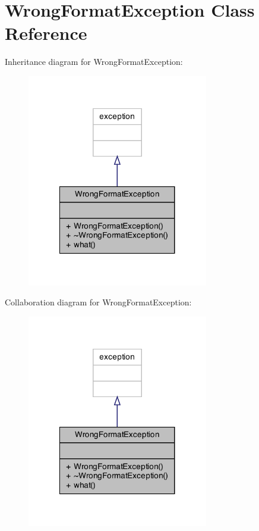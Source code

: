 \hypertarget{class_wrong_format_exception}{\section{Wrong\+Format\+Exception Class Reference}
\label{class_wrong_format_exception}
}


Inheritance diagram for Wrong\+Format\+Exception\+:\nopagebreak
\begin{figure}[H]
\begin{center}
\leavevmode
\includegraphics[width=224pt]{class_wrong_format_exception__inherit__graph}
\end{center}
\end{figure}


Collaboration diagram for Wrong\+Format\+Exception\+:\nopagebreak
\begin{figure}[H]
\begin{center}
\leavevmode
\includegraphics[width=224pt]{class_wrong_format_exception__coll__graph}
\end{center}
\end{figure}

